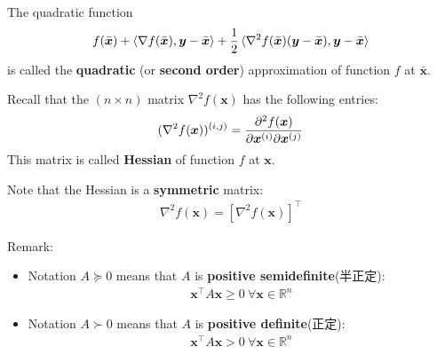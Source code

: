 The quadratic function
\begin{align*}
    f(\bar{\bm x})+\braket{\nabla f(\bar{\bm x}),\bm y-\bar{\bm x}}+\frac{1}{2}\braket{\nabla^2 f(\bar{\bm x})(\bm y-\bar{\bm x}),\bm y-\bar{\bm x}}
\end{align*}
is called the \textbf{quadratic} (or \textbf{second order}) approximation of function $f$ at $\bar{\bm x}$. 

Recall that the $(n\times n)$ matrix $\nabla^2 f(\bm x)$ has the following entries:
\begin{align*}
    (\nabla^2 f(\bm x))^{(i,j)}=\frac{\partial ^2f(\bm x)}{\partial \bm x^{(i)}\partial \bm x^{(j)}}
\end{align*}
This matrix is called \textbf{Hessian} of function $f$ at $\bm x$. 

Note that the Hessian is a \textbf{symmetric} matrix:
\begin{align*}
    \nabla^2 f(\bm x)=[\nabla^2 f(\bm x)]^\top
\end{align*}

Remark: 
\begin{itemize}
    \item Notation $A\succeq 0$ means that $A$ is \textbf{positive semidefinite}(半正定): 
    \begin{align*}
        \bm x^\top A \bm x\ge 0\ \forall \bm x \in \mathbb{R}^n
    \end{align*}
    \item Notation $A\succ 0$ means that $A$ is \textbf{positive definite}(正定): 
    \begin{align*}
        \bm x^\top A \bm x> 0\ \forall \bm x \in \mathbb{R}^n
    \end{align*}
\end{itemize}

